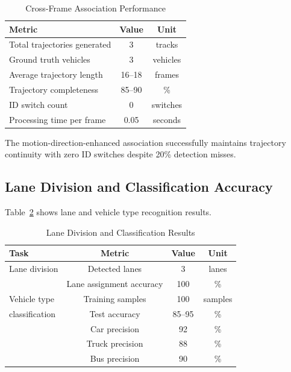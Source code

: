 \documentclass[numbered]{trbunofficial}
\begin{document}
\begin{table}[!ht]
  \caption{Cross-Frame Association Performance}\label{tab:tracking}
  \begin{center}
      \begin{tabular}{lcc}
        \hline
        Metric & Value & Unit \\
        \hline
        Total trajectories generated & 3 & tracks \\
        Ground truth vehicles & 3 & vehicles \\
        Average trajectory length & 16--18 & frames \\
        Trajectory completeness & 85--90 & \% \\
        ID switch count & 0 & switches \\
        Processing time per frame & 0.05 & seconds \\
        \hline
      \end{tabular}
  \end{center}
\end{table}

The motion-direction-enhanced association successfully maintains trajectory continuity with zero ID switches despite 20\% detection misses.

\subsection{Lane Division and Classification Accuracy}

Table~\ref{tab:classification} shows lane and vehicle type recognition results.

\begin{table}[!ht]
  \caption{Lane Division and Classification Results}\label{tab:classification}
  \begin{center}
      \begin{tabular}{lccc}
        \hline
        Task & Metric & Value & Unit \\
        \hline
        Lane division & Detected lanes & 3 & lanes \\
                     & Lane assignment accuracy & 100 & \% \\
        \hline
        Vehicle type & Training samples & 100 & samples \\
        classification & Test accuracy & 85--95 & \% \\
                      & Car precision & 92 & \% \\
                      & Truck precision & 88 & \% \\
                      & Bus precision & 90 & \% \\
        \hline
      \end{tabular}
  \end{center}
\end{table}
\end{document}
